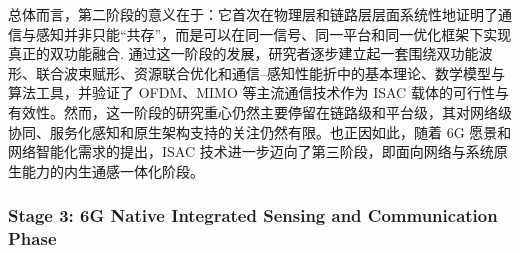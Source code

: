 总体而言，第二阶段的意义在于：它首次在物理层和链路层层面系统性地证明了通信与感知并非只能“共存”，而是可以在同一信号、同一平台和同一优化框架下实现真正的双功能融合\cite{Liu2020JointRadarComm,Liu2022ISAC,Hassanien2015dual}. 通过这一阶段的发展，研究者逐步建立起一套围绕双功能波形、联合波束赋形、资源联合优化和通信--感知性能折中的基本理论、数学模型与算法工具，并验证了 OFDM、MIMO 等主流通信技术作为 ISAC 载体的可行性与有效性。然而，这一阶段的研究重心仍然主要停留在链路级和平台级，其对网络级协同、服务化感知和原生架构支持的关注仍然有限。也正因如此，随着 6G 愿景和网络智能化需求的提出，ISAC 技术进一步迈向了第三阶段，即面向网络与系统原生能力的内生通感一体化阶段。

\subsubsection{Stage 3: 6G Native Integrated Sensing and Communication Phase}
\label{subsubsec:ch1-stage3}

